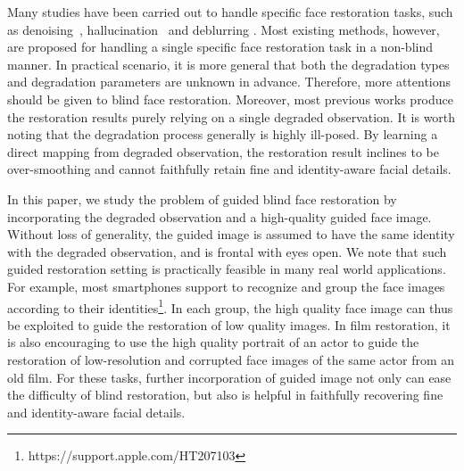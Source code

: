 \documentclass[runningheads]{llncs}
\begin{document}
Many studies have been carried out to handle specific face restoration tasks, such as denoising~\cite{anwar2017category,Anwar2017BMVC}, hallucination~\cite{baker2000hallucinating,liu2007face,zhu2016deep,yu2016ultra,cao2017attention,chen2017fsrnet,yu2017face,huang2017wavelet,xu2017learning,yu2017hallucinating} and deblurring \cite{chrysos2017deep}.
Most existing methods, however, are proposed for handling a single specific face restoration task in a non-blind manner.
In practical scenario, it is more general that both the degradation types and degradation parameters are unknown in advance.
Therefore, more attentions should be given to blind face restoration.
Moreover, most previous works produce the restoration results purely relying on a single degraded observation.
It is worth noting that the degradation process generally is highly ill-posed.
By learning a direct mapping from degraded observation, the restoration result inclines to be over-smoothing and cannot faithfully retain fine and identity-aware facial details.


In this paper, we study the problem of guided blind face restoration by incorporating the degraded observation and a high-quality guided face image.
Without loss of generality, the guided image is assumed to have the same identity with the degraded observation, and is frontal with eyes open. We note that such guided restoration setting is practically feasible in many real world applications.
For example, most smartphones support to recognize and group the face images according to their identities\footnote{https://support.apple.com/HT207103}.
In each group, the high quality face image can thus be exploited to guide the restoration of low quality images.
In film restoration, it is also encouraging to use the high quality portrait of an actor to guide the restoration of low-resolution and corrupted face images of the same actor from an old film.
For these tasks,
further incorporation of guided image not only can ease the difficulty of blind restoration, but also is helpful in faithfully recovering fine and identity-aware facial details.
\end{document}
